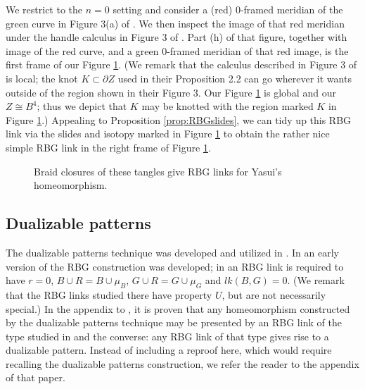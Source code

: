 \documentclass [11pt]{amsart}
\makeatletter
\newcommand{\addresseshere}{%
  \enddoc@text\let\enddoc@text\relax
}
\theoremstyle{remark}
\makeatother
\begin{document}
We restrict to the $n=0$ setting and consider a (red) 0-framed meridian of the green curve in Figure 3(a) of \cite{HMP19}. We then inspect the image of that red meridian under the handle calculus in Figure 3 of  \cite{HMP19}. Part (h) of that figure, together with image of the red curve, and a green 0-framed meridian of that red image, is the first frame of our Figure \ref{fig:rbgforyasui}. (We remark that the calculus described in Figure 3 of \cite{HMP19}  is local; the knot $K\subset \partial Z$ used in their Proposition 2.2 can go wherever it wants outside of the region shown in their Figure 3. Our Figure \ref{fig:rbgforyasui} is global and our  $Z\cong B^4$; thus we depict that $K$ may be knotted with the region marked $K$ in Figure \ref{fig:rbgforyasui}.) Appealing to Proposition \ref{prop:RBGslides}, we can tidy up this RBG link via the slides and isotopy marked in Figure \ref{fig:rbgforyasui} to obtain the rather nice simple RBG link in the right frame of Figure \ref{fig:rbgforyasui}.
\begin{figure}
{
   \fontsize{9pt}{11pt}\selectfont
   \def\svgwidth{3.5in}
   
}
\caption{Braid closures of these tangles give RBG links for Yasui's homeomorphism.}\label{fig:rbgforyasui}
\end{figure}


\subsection{Dualizable patterns}
The dualizable patterns technique was developed and utilized in \cite{Akb2Dhom, Lickorish2, Brakes, GM, BakerMotegi, MP17}. In \cite{Pic1} an early version of the RBG construction was developed; in \cite{Pic1} an RBG link is required to have $r=0$, $B \cup R = B \cup\mu_B$, $G \cup R = G \cup \mu_G$ and $lk(B, G) =0$. (We remark that the RBG links studied there have property $U$, but are not necessarily special.) In the appendix to \cite{Pic1}, it is proven that any homeomorphism constructed by the dualizable patterns technique may be presented by an RBG link of the type studied in \cite{Pic1} and the converse: any RBG link of that type gives rise to a dualizable pattern. Instead of including a reproof here, which would require recalling the dualizable patterns construction, we refer the reader to the appendix of that paper. 





\addresseshere
\end{document}
